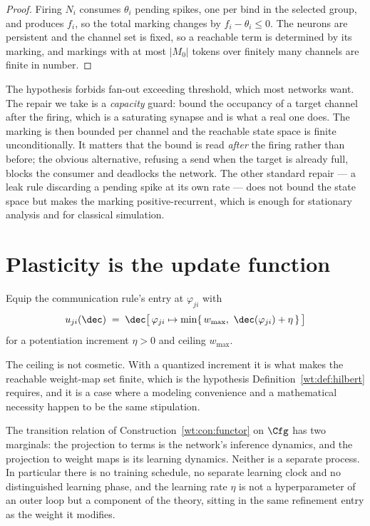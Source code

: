 \begin{proof}
Firing $N_i$ consumes $\theta_i$ pending spikes, one per bind in the selected group, and
produces $f_i$, so the total marking changes by $f_i - \theta_i \leq 0$. The neurons are
persistent and the channel set is fixed, so a reachable term is determined by its
marking, and markings with at most $|M_0|$ tokens over finitely many channels are finite
in number.
\end{proof}

The hypothesis forbids fan-out exceeding threshold, which most networks want. The repair
we take is a \emph{capacity} guard: bound the occupancy of a target channel after the
firing, which is a saturating synapse and is what a real one does. The marking is then
bounded per channel and the reachable state space is finite unconditionally. It matters
that the bound is read \emph{after} the firing rather than before; the obvious
alternative, refusing a send when the target is already full, blocks the consumer and
deadlocks the network. The other standard repair --- a leak rule discarding a pending
spike at its own rate --- does not bound the state space but makes the marking
positive-recurrent, which is enough for stationary analysis and for classical simulation.

\section{Plasticity is the update function}

\begin{definition}
\label{spk:def:hebb}
Equip the communication rule's entry at $\varphi_{ji}$ with
\[
  u_{ji}(\dec) \;=\; \dec\bigl[\,\varphi_{ji} \mapsto \min\{\,w_{\max},\ \dec(\varphi_{ji}) + \eta\,\}\,\bigr]
\]
for a potentiation increment $\eta > 0$ and ceiling $w_{\max}$.
\end{definition}

The ceiling is not cosmetic. With a quantized increment it is what makes the reachable
weight-map set finite, which is the hypothesis Definition~\ref{wt:def:hilbert} requires,
and it is a case where a modeling convenience and a mathematical necessity happen to be
the same stipulation.

\begin{theorem}
\label{spk:thm:one}
The transition relation of Construction~\ref{wt:con:functor} on $\Cfg$ has two marginals:
the projection to terms is the network's inference dynamics, and the projection to weight
maps is its learning dynamics. Neither is a separate process. In particular there is no
training schedule, no separate learning clock and no distinguished learning phase, and
the learning rate $\eta$ is not a hyperparameter of an outer loop but a component of the
theory, sitting in the same refinement entry as the weight it modifies.
\end{theorem}

